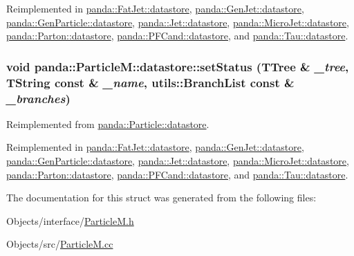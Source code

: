 Reimplemented in \hyperlink{structpanda_1_1FatJet_1_1datastore_a0064ba6151edcef6eb9d4c5b6a9fdcf7}{panda::FatJet::datastore}, \hyperlink{structpanda_1_1GenJet_1_1datastore_a7afa28bd4468d7ecb3c4c086d46ee6cf}{panda::GenJet::datastore}, \hyperlink{structpanda_1_1GenParticle_1_1datastore_ae55290c7499a0b5c80309462637d9e73}{panda::GenParticle::datastore}, \hyperlink{structpanda_1_1Jet_1_1datastore_aba38557e272994b9913ffbe323892d7d}{panda::Jet::datastore}, \hyperlink{structpanda_1_1MicroJet_1_1datastore_a475b19becb4a39eb0248e8b9c785feb3}{panda::MicroJet::datastore}, \hyperlink{structpanda_1_1Parton_1_1datastore_a2348c36dbc9d5f769fac19fcb9582e5a}{panda::Parton::datastore}, \hyperlink{structpanda_1_1PFCand_1_1datastore_a9f79eb8960ad6be9157ed49ec37f4258}{panda::PFCand::datastore}, and \hyperlink{structpanda_1_1Tau_1_1datastore_a4cbb512cb1da538b968aa7bfea700f2b}{panda::Tau::datastore}.\hypertarget{structpanda_1_1ParticleM_1_1datastore_a0329bec2c84d16ff16e15824890e7a86}{
\subsubsection[{setStatus}]{\setlength{\rightskip}{0pt plus 5cm}void panda::ParticleM::datastore::setStatus (TTree \& {\em \_\-tree}, \/  TString const \& {\em \_\-name}, \/  {\bf utils::BranchList} const \& {\em \_\-branches})}}
\label{structpanda_1_1ParticleM_1_1datastore_a0329bec2c84d16ff16e15824890e7a86}


Reimplemented from \hyperlink{structpanda_1_1Particle_1_1datastore_a82fcd5398687827418d8bdcbfc16d661}{panda::Particle::datastore}.

Reimplemented in \hyperlink{structpanda_1_1FatJet_1_1datastore_a7c0b79a4a6e7875278841d4bc8a7deba}{panda::FatJet::datastore}, \hyperlink{structpanda_1_1GenJet_1_1datastore_a7b9f67fdc168e7a372a9430c2b9866e3}{panda::GenJet::datastore}, \hyperlink{structpanda_1_1GenParticle_1_1datastore_ae4c5f9b8868d49879bba872aeb7b1027}{panda::GenParticle::datastore}, \hyperlink{structpanda_1_1Jet_1_1datastore_ae5a3ebcab7eefec1efc08e4f714ce2ad}{panda::Jet::datastore}, \hyperlink{structpanda_1_1MicroJet_1_1datastore_a5dad86e6e7ed7f7ee5ffb793bb81cbbe}{panda::MicroJet::datastore}, \hyperlink{structpanda_1_1Parton_1_1datastore_a923a18c356315d4083798fe11bb2c942}{panda::Parton::datastore}, \hyperlink{structpanda_1_1PFCand_1_1datastore_a7efac265d60666c7ce27d78adbbf0fbb}{panda::PFCand::datastore}, and \hyperlink{structpanda_1_1Tau_1_1datastore_a528e0b260c39c11862f8631cf9e1743e}{panda::Tau::datastore}.

The documentation for this struct was generated from the following files:\begin{DoxyCompactItemize}
\item 
Objects/interface/\hyperlink{ParticleM_8h}{ParticleM.h}\item 
Objects/src/\hyperlink{ParticleM_8cc}{ParticleM.cc}\end{DoxyCompactItemize}
